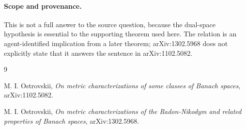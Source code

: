 \documentclass[11pt]{article}
\begin{document}
\paragraph{Scope and provenance.}
This is not a full answer to the source question, because the dual-space
hypothesis is essential to the supporting theorem used here.  The relation is
an agent-identified implication from a later theorem; arXiv:1302.5968 does not
explicitly state that it answers the sentence in arXiv:1102.5082.

\begin{thebibliography}{9}

M. I. Ostrovskii,
\emph{On metric characterizations of some classes of Banach spaces},
arXiv:1102.5082.

M. I. Ostrovskii,
\emph{On metric characterizations of the Radon-Nikodym and related properties
of Banach spaces},
arXiv:1302.5968.

\end{thebibliography}
\end{document}
